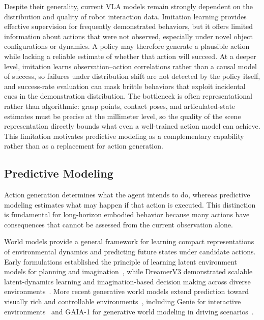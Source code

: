 \documentclass{SCIS2026}
\begin{document}
Despite their generality, current VLA models remain strongly dependent on the distribution and quality of robot interaction data. Imitation learning provides effective supervision for frequently demonstrated behaviors, but it offers limited information about actions that were not observed, especially under novel object configurations or dynamics. A policy may therefore generate a plausible action while lacking a reliable estimate of whether that action will succeed. At a deeper level, imitation learns observation--action correlations rather than a causal model of success, so failures under distribution shift are not detected by the policy itself, and success-rate evaluation can mask brittle behaviors that exploit incidental cues in the demonstration distribution. The bottleneck is often representational rather than algorithmic: grasp points, contact poses, and articulated-state estimates must be precise at the millimeter level, so the quality of the scene representation directly bounds what even a well-trained action model can achieve. This limitation motivates predictive modeling as a complementary capability rather than as a replacement for action generation.

\subsection{Predictive Modeling}
Action generation determines what the agent intends to do, whereas predictive modeling estimates what may happen if that action is executed. This distinction is fundamental for long-horizon embodied behavior because many actions have consequences that cannot be assessed from the current observation alone.

World models provide a general framework for learning compact representations of environmental dynamics and predicting future states under candidate actions. Early formulations established the principle of learning latent environment models for planning and imagination~\cite{ha2018world}, while DreamerV3 demonstrated scalable latent-dynamics learning and imagination-based decision making across diverse environments~\cite{hafner2023mastering}. More recent generative world models extend prediction toward visually rich and controllable environments~\cite{brooks2024video}, including Genie for interactive environments~\cite{bruce2024genie} and GAIA-1 for generative world modeling in driving scenarios~\cite{hu2023gaia}.
\end{document}
